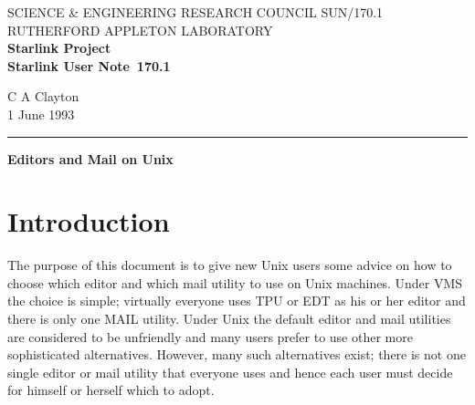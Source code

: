 \pagestyle{myheadings}

\newcommand{\stardoccategory}  {Starlink User Note}
\newcommand{\stardocinitials}  {SUN}
\newcommand{\stardocnumber}    {170.1}
\newcommand{\stardocauthors}   {C A Clayton}
\newcommand{\stardocdate}      {1 June 1993}
\newcommand{\stardoctitle}     {Editors and Mail on Unix}

\newcommand{\stardocname}{\stardocinitials /\stardocnumber}
\renewcommand{\_}{{\tt\char'137}}     %
\markright{\stardocname}
\setlength{\textwidth}{160mm}
\setlength{\textheight}{230mm}
\setlength{\topmargin}{-2mm}
\setlength{\oddsidemargin}{0mm}
\setlength{\evensidemargin}{0mm}
\setlength{\parindent}{0mm}
\setlength{\parskip}{\medskipamount}
\setlength{\unitlength}{1mm}



\thispagestyle{empty}
SCIENCE \& ENGINEERING RESEARCH COUNCIL \hfill \stardocname\\
RUTHERFORD APPLETON LABORATORY\\
{\large\bf Starlink Project\\}
{\large\bf \stardoccategory\ \stardocnumber}
\begin{flushright}
\stardocauthors\\
\stardocdate
\end{flushright}
\vspace{-4mm}
\rule{\textwidth}{0.5mm}
\vspace{5mm}
\begin{center}
{\Large\bf \stardoctitle}
\end{center}
\vspace{5mm}

\section{Introduction}

The purpose of this document is to give new Unix users some advice on how
to choose which editor and which mail utility to use on Unix machines.
Under VMS the choice is simple; virtually everyone uses TPU or EDT as
his or her editor and there is only one MAIL utility. Under Unix the default
editor and mail utilities are considered to be unfriendly and many users prefer
to use other more sophisticated alternatives. However, many such alternatives
exist; there is not one single editor or mail utility that everyone 
uses and hence each user must decide for himself or herself which to adopt. 


